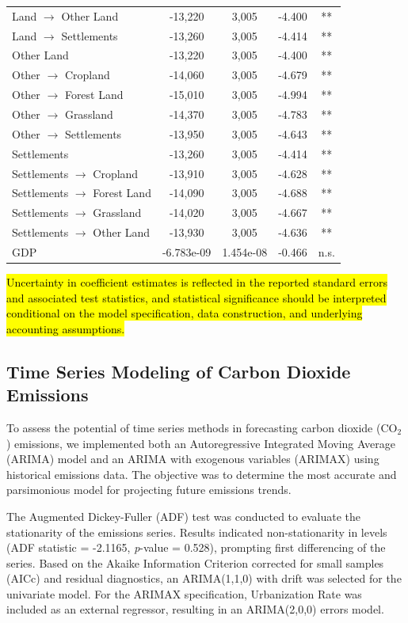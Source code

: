 \documentclass[10pt,letterpaper]{article}
\begin{document}
\begin{longtable}{lcccc}
	Land $\rightarrow$ Other Land & -13,220 & 3,005 & -4.400 & ** \\
	Land $\rightarrow$ Settlements & -13,260 & 3,005 & -4.414 & ** \\
	Other Land & -13,220 & 3,005 & -4.400 & ** \\
	Other $\rightarrow$ Cropland & -14,060 & 3,005 & -4.679 & ** \\
	Other $\rightarrow$ Forest Land & -15,010 & 3,005 & -4.994 & ** \\
	Other $\rightarrow$ Grassland & -14,370 & 3,005 & -4.783 & ** \\
	Other $\rightarrow$ Settlements & -13,950 & 3,005 & -4.643 & ** \\
	Settlements & -13,260 & 3,005 & -4.414 & ** \\
	Settlements $\rightarrow$ Cropland & -13,910 & 3,005 & -4.628 & ** \\
	Settlements $\rightarrow$ Forest Land & -14,090 & 3,005 & -4.688 & ** \\
	Settlements $\rightarrow$ Grassland & -14,020 & 3,005 & -4.667 & ** \\
	Settlements $\rightarrow$ Other Land & -13,930 & 3,005 & -4.636 & ** \\
	GDP & -6.783e-09 & 1.454e-08 & -0.466 & n.s. \\
\end{longtable}

\hl{Uncertainty in coefficient estimates is reflected in the reported standard errors and associated test statistics, and statistical significance should be interpreted conditional on the model specification, data construction, and underlying accounting assumptions.}







\subsection{Time Series Modeling of Carbon Dioxide Emissions}

To assess the potential of time series methods in forecasting carbon dioxide (CO$_2$) emissions, we implemented both an Autoregressive Integrated Moving Average (ARIMA) model and an ARIMA with exogenous variables (ARIMAX) using historical emissions data. The objective was to determine the most accurate and parsimonious model for projecting future emissions trends.



The Augmented Dickey-Fuller (ADF) test was conducted to evaluate the stationarity of the emissions series. Results indicated non-stationarity in levels (ADF statistic = -2.1165, \emph{p}-value = 0.528), prompting first differencing of the series. Based on the Akaike Information Criterion corrected for small samples (AICc) and residual diagnostics, an ARIMA(1,1,0) with drift was selected for the univariate model. For the ARIMAX specification, Urbanization Rate was included as an external regressor, resulting in an ARIMA(2,0,0) errors model.
\end{document}
